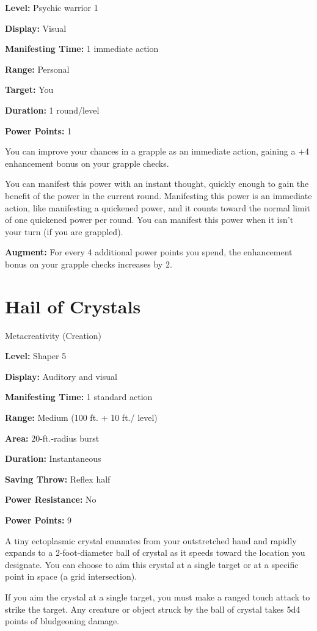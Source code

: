 \documentclass{article}
\begin{document}
\textbf{Level:} Psychic warrior 1

\textbf{Display:} Visual

\textbf{Manifesting Time:} 1 immediate action

\textbf{Range:} Personal

\textbf{Target:} You

\textbf{Duration:} 1 round/level

\textbf{Power Points:} 1

You can improve your chances in a grapple as an immediate action, gaining a +4 
enhancement bonus on your grapple checks.

You can manifest this power with an instant thought, quickly enough to gain the 
benefit of the power in the current round. Manifesting this power is an immediate 
action, like manifesting a quickened power, and it counts toward the normal limit 
of one quickened power per round. You can manifest this power when it isn't your 
turn (if you are grappled).

\textbf{Augment:} For every 4 additional power points you spend, the enhancement 
bonus on your grapple checks increases by 2.

\vspace{12pt}
\section*{Hail of Crystals}

Metacreativity (Creation)

\textbf{Level:} Shaper 5

\textbf{Display:} Auditory and visual

\textbf{Manifesting Time:} 1 standard action

\textbf{Range:} Medium (100 ft. + 10 ft./ level)

\textbf{Area:} 20-ft.-radius burst

\textbf{Duration:} Instantaneous

\textbf{Saving Throw:} Reflex half

\textbf{Power Resistance:} No

\textbf{Power Points:} 9

A tiny ectoplasmic crystal emanates from your outstretched hand and rapidly expands 
to a 2-foot-diameter ball of crystal as it speeds toward the location you designate. 
You can choose to aim this crystal at a single target or at a specific point in 
space (a grid intersection).

If you aim the crystal at a single target, you must make a ranged touch attack 
to strike the target. Any creature or object struck by the ball of crystal takes 
5d4 points of bludgeoning damage.
\end{document}
